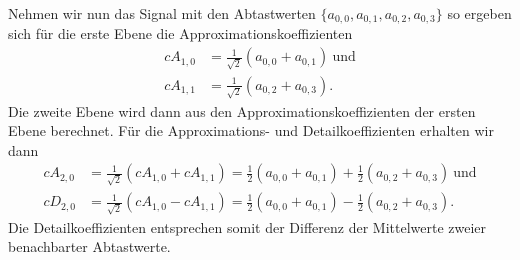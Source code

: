 \begin{refsection}
Nehmen wir nun das Signal mit den Abtastwerten $\{a_{0,0}, a_{0,1}, a_{0,2},
a_{0,3}\}$ so ergeben sich für die erste Ebene die Approximationskoeffizienten
\begin{align}
cA_{1,0}
&=
\frac{1}{\sqrt{2}} (a_{0,0} + a_{0,1})~\text{und}
\nonumber \\
cA_{1,1}
&=
\frac{1}{\sqrt{2}} (a_{0,2} + a_{0,3}).
\end{align}
Die zweite Ebene wird dann aus den Approximationskoeffizienten der ersten Ebene
berechnet. Für die Approximations- und Detailkoeffizienten erhalten wir dann
\begin{align}
cA_{2,0}
&=
\frac{1}{\sqrt{2}} (cA_{1,0} + cA_{1,1})
=
\frac{1}{2} (a_{0,0} + a_{0,1}) + \frac{1}{2} (a_{0,2} + a_{0,3})~\text{und}
\nonumber \\
cD_{2,0}
&=
\frac{1}{\sqrt{2}} (cA_{1,0} - cA_{1,1})
=
\frac{1}{2} (a_{0,0} + a_{0,1}) - \frac{1}{2} (a_{0,2} + a_{0,3}).
\end{align}
Die Detailkoeffizienten entsprechen somit der Differenz der Mittelwerte zweier
benachbarter Abtastwerte.


\end{refsection}
